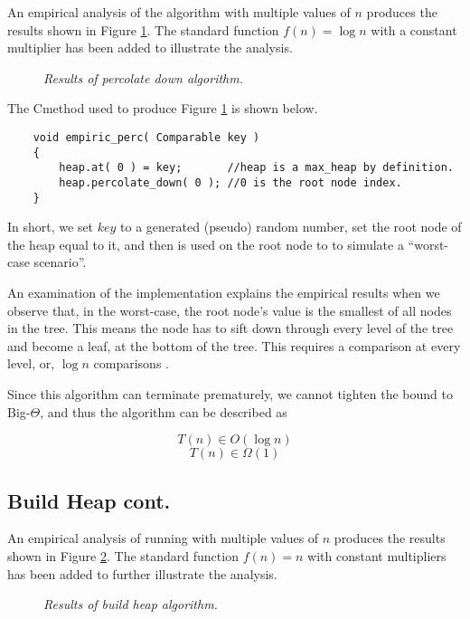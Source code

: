 \documentclass[11pt]{article}
\def\CC{{C\nolinebreak[4]\hspace{-.05em}\raisebox{.4ex}{\tiny\bf ++ }}}
\begin{document}
An empirical analysis of the  algorithm with multiple values of $n$ produces the results shown in Figure \ref{fig:perc}. The standard function $f(n) = \log n$ with a constant multiplier has been added to illustrate the analysis.

\begin{figure} [h]
\begin{center}
    
    \caption{\small \sl Results of percolate down algorithm.\label{fig:perc}}  

\end{center}
\end{figure}
The \CC method used to produce Figure \ref{fig:perc} is shown below.

\begin{lstlisting}
    void empiric_perc( Comparable key )
    {
        heap.at( 0 ) = key; 	  //heap is a max_heap by definition.
        heap.percolate_down( 0 ); //0 is the root node index.
    }
\end{lstlisting}

In short, we set $key$ to a generated (pseudo) random number, set the root node of the heap equal to it, and then  is used on the root node to to simulate a ``worst-case scenario''.

An examination of the  implementation explains the empirical results when we observe that, in the worst-case, the root node's value is the smallest of all nodes in the tree. This means the node has to sift down through every level of the tree and become a leaf, at the bottom of the tree. This requires a comparison at every level, or, $\log n$ comparisons \cite{anal}.

Since this algorithm can terminate prematurely, we cannot tighten the bound to Big-$\Theta$, and thus the  algorithm can be described as 

\[
T(n) \in O( \log n)
\]
\[
T(n) \in \Omega(1)
\]
\clearpage
\subsection{Build Heap cont.}

An empirical analysis of running  with multiple values of $n$ produces the results shown in Figure \ref{fig:build}. The standard function $f(n) = n$ with constant multipliers has been added to further illustrate the analysis.
\begin{figure}[h]
\begin{center}
    
     \caption{\small \sl Results of build heap algorithm.\label{fig:build}}  
\end{center}
\end{figure}
\end{document}
